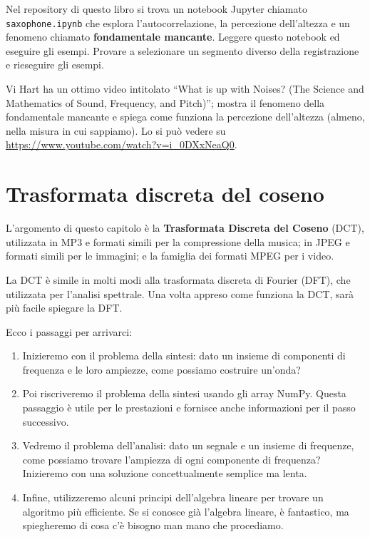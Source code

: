 \documentclass[12pt,a4paper]{book}
\begin{document}
\begin{exercise} Nel repository di questo libro si trova un notebook Jupyter chiamato \verb"saxophone.ipynb" che esplora l'autocorrelazione, la percezione dell'altezza e un fenomeno chiamato {\bf fondamentale mancante}. Leggere questo notebook ed eseguire gli esempi. Provare a selezionare un segmento diverso della registrazione e rieseguire gli esempi.

Vi Hart ha un ottimo video intitolato ``What is up with Noises? (The Science and Mathematics of Sound, Frequency, and Pitch)''; mostra il fenomeno della fondamentale mancante e spiega come funziona la percezione dell'altezza (almeno, nella misura in cui sappiamo). Lo si può vedere su \url{https://www.youtube.com/watch?v=i_0DXxNeaQ0}.

\end{exercise} 

\chapter{Trasformata discreta del coseno} \label{dct} 

L'argomento di questo capitolo è la {\bf Trasformata Discreta del Coseno} (DCT), utilizzata in MP3 e formati simili per la compressione della musica; in JPEG e formati simili per le immagini; e la famiglia dei formati MPEG per i video.

La DCT è simile in molti modi alla trasformata discreta di Fourier (DFT), che utilizzata per l'analisi spettrale. Una volta appreso come funziona la DCT, sarà più facile spiegare la DFT.

Ecco i passaggi per arrivarci:

\begin{enumerate} 

\item Inizieremo con il problema della sintesi: dato un insieme di componenti di frequenza e le loro ampiezze, come possiamo costruire un'onda?

\item Poi riscriveremo il problema della sintesi usando gli array NumPy. Questa passaggio è utile per le prestazioni e fornisce anche informazioni per il passo successivo.

\item Vedremo il problema dell'analisi: dato un segnale e un insieme di frequenze, come possiamo trovare l'ampiezza di ogni componente di frequenza? Inizieremo con una soluzione concettualmente semplice ma lenta.

\item Infine, utilizzeremo alcuni principi dell'algebra lineare per trovare un algoritmo più efficiente. Se si conosce già l'algebra lineare, è fantastico, ma spiegheremo di cosa c'è bisogno man mano che procediamo.

\end{enumerate} 
\end{document}
